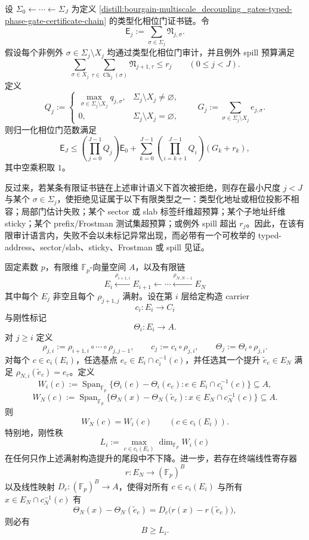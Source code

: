 \begin{theorem}[类型化相位门证书链的归一化转移与首次失败分类]\label{distill:bourgain-multiscale_decoupling_gates-typed-phase-gate-certificate-chain-transfer}
设 \(\Sigma_0\leftarrow\cdots\leftarrow\Sigma_J\) 为定义 \ref{distill:bourgain-multiscale_decoupling_gates-typed-phase-gate-certificate-chain} 的类型化相位门证书链。令
\[
\mathsf E_j:=\sum_{\sigma\in\Sigma_j}\mathfrak N_{j,\sigma}.
\]
假设每个非例外 \(\sigma\in\Sigma_j\setminus X_j\) 均通过类型化相位门审计，并且例外 spill 预算满足
\[
\sum_{\sigma\in X_j}\sum_{\tau\in\operatorname{Ch}_j(\sigma)}
\mathfrak N_{j+1,\tau}\le r_j
\qquad(0\le j<J).
\]
定义
\[
Q_j:=
\begin{cases}
\max_{\sigma\in\Sigma_j\setminus X_j}q_{j,\sigma},&\Sigma_j\setminus X_j\ne\varnothing,\\
0,&\Sigma_j\setminus X_j=\varnothing,
\end{cases}
\qquad
G_j:=\sum_{\sigma\in\Sigma_j\setminus X_j}e_{j,\sigma}.
\]
则归一化相位门范数满足
\[
\mathsf E_J
\le
\left(\prod_{j=0}^{J-1}Q_j\right)\mathsf E_0
+
\sum_{k=0}^{J-1}
\left(\prod_{i=k+1}^{J-1}Q_i\right)(G_k+r_k),
\]
其中空乘积取 \(1\)。

反过来，若某条有限证书链在上述审计语义下首次被拒绝，则存在最小尺度 \(j<J\) 与某个 \(\sigma\in\Sigma_j\)，使拒绝见证属于以下有限类型之一：类型化地址或相位投影不相容；局部门估计失败；某个 sector 或 slab 标签纤维超预算；某个子地址纤维 sticky；某个 prefix/Frostman 测试集超预算；或例外 spill 超出 \(r_j\)。因此，在该有限审计语言内，失败不会以未标记异常出现，而必带有一个可枚举的 typed-address、sector/slab、sticky、Frostman 或 spill 见证。
\end{theorem}

\begin{theorem}[构造尾段不降低刚性秩与终端寄存器下界]\label{distill:bourgain-entropy_increment_closure-construction-tail-rigidity-rank-propagation}
固定素数 \(p\)，有限维 \(\mathbb F_p\)-向量空间 \(A\)，以及有限链
\[
E_i\xleftarrow{\rho_{i+1,i}}E_{i+1}\xleftarrow{}\cdots\xleftarrow{\rho_{N,N-1}}E_N
\]
其中每个 \(E_j\) 非空且每个 \(\rho_{j+1,j}\) 满射。设在第 \(i\) 层给定构造 carrier
\[
c_i:E_i\longrightarrow C_i
\]
与刚性标记
\[
\Theta_i:E_i\longrightarrow A.
\]
对 \(j\ge i\) 定义
\[
\rho_{j,i}:=\rho_{i+1,i}\circ\cdots\circ\rho_{j,j-1},
\qquad
c_j:=c_i\circ\rho_{j,i},
\qquad
\Theta_j:=\Theta_i\circ\rho_{j,i}.
\]
对每个 \(c\in c_i(E_i)\)，任选基点 \(e_c\in E_i\cap c_i^{-1}(c)\)，并任选其一个提升 \(\widetilde e_c\in E_N\) 满足 \(\rho_{N,i}(\widetilde e_c)=e_c\)。定义
\[
W_i(c):=\operatorname{Span}_{\mathbb F_p}\{\Theta_i(e)-\Theta_i(e_c):e\in E_i\cap c_i^{-1}(c)\}\subseteq A,
\]
\[
W_N(c):=\operatorname{Span}_{\mathbb F_p}\{\Theta_N(x)-\Theta_N(\widetilde e_c):x\in E_N\cap c_N^{-1}(c)\}\subseteq A.
\]
则
\[
W_N(c)=W_i(c)
\qquad(c\in c_i(E_i)).
\]
特别地，刚性秩
\[
L_i:=\max_{c\in c_i(E_i)}\dim_{\mathbb F_p}W_i(c)
\]
在任何只作上述满射构造提升的尾段中不下降。进一步，若存在终端线性寄存器
\[
r:E_N\longrightarrow (\mathbb F_p)^B
\]
以及线性映射 \(D_c:(\mathbb F_p)^B\to A\)，使得对所有 \(c\in c_i(E_i)\) 与所有 \(x\in E_N\cap c_N^{-1}(c)\) 有
\[
\Theta_N(x)-\Theta_N(\widetilde e_c)
=
D_c\bigl(r(x)-r(\widetilde e_c)\bigr),
\]
则必有
\[
B\ge L_i.
\]
\end{theorem}

